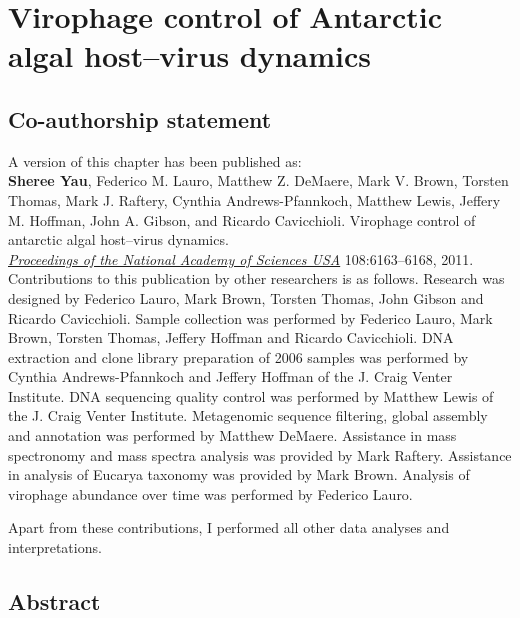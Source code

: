 \chapter{Virophage control of Antarctic algal host--virus dynamics}
\label{ch:olv}
\acresetall

\section*{Co-authorship statement}

A version of this chapter has been published as:\\

\textbf{Sheree Yau}, Federico M. Lauro, Matthew Z. DeMaere, Mark V. Brown, Torsten Thomas,
Mark J. Raftery, Cynthia Andrews-Pfannkoch, Matthew Lewis, Jeffery M. Hoffman, John A. Gibson, and
Ricardo Cavicchioli.
Virophage control of antarctic algal host--virus dynamics.\\
\emph{\underline{Proceedings of the National Academy of Sciences USA}}
108:6163--6168, 2011.\\

Contributions to this publication by other researchers is as follows.
Research was designed by Federico Lauro, Mark Brown, Torsten Thomas, John Gibson and Ricardo Cavicchioli.
Sample collection was performed by Federico Lauro, Mark Brown, Torsten Thomas, Jeffery Hoffman and Ricardo Cavicchioli.
\textsc{DNA} extraction and clone library preparation of 2006 samples was performed by Cynthia Andrews-Pfannkoch and Jeffery Hoffman of the J. Craig Venter Institute.
\textsc{DNA} sequencing quality control was performed by Matthew Lewis of the J. Craig Venter Institute.
Metagenomic sequence filtering, global assembly and annotation was performed by Matthew DeMaere.
Assistance in mass spectronomy and mass spectra analysis was provided by Mark Raftery.
Assistance in analysis of Eucarya taxonomy was provided by Mark Brown.
Analysis of virophage abundance over time was performed by Federico Lauro.

Apart from these contributions, I performed all other data analyses and interpretations.
\newpage


\section{Abstract}

